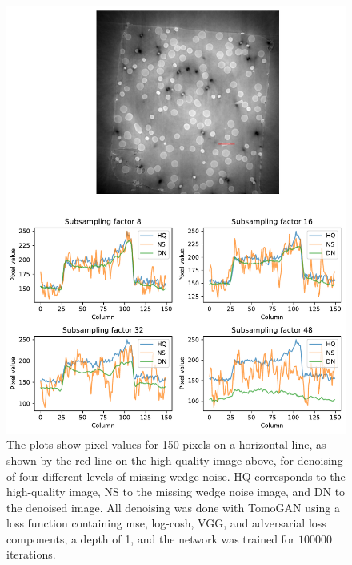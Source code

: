 \begin{figure}[htbp]
  \centering
  \includegraphics[width=.95\textwidth]{figures/differentnoiselineplot1.pdf}
  \caption[Line plot of denoising of different levels of noise]{The plots show pixel values for 150 pixels on a horizontal line, as shown by the red line on the high-quality image above, for denoising of four different levels of missing wedge noise. HQ corresponds to the high-quality image, NS to the missing wedge noise image, and DN to the denoised image. All denoising was done with TomoGAN using a loss function containing \acrshort{mse}, log-cosh, VGG, and adversarial loss components, a depth of 1, and the network was trained for $100 000$ iterations. }
  \label{fig:differentnoiselineplot1}
\end{figure}

